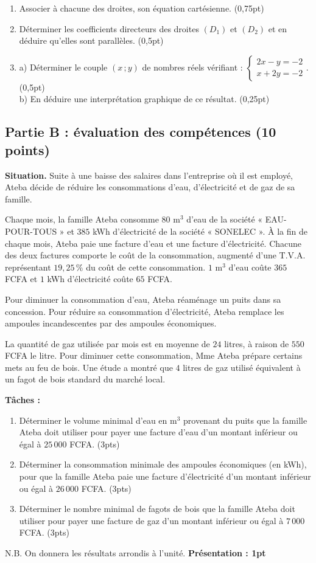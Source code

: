 \begin{enumerate}[label=\arabic*)]
\item Associer à chacune des droites, son équation cartésienne. \hfill (0,75pt)
\item Déterminer les coefficients directeurs des droites $(D_1)$ et $(D_2)$ et en déduire
qu'elles sont parallèles. \hfill (0,5pt)
\item[3)] a) Déterminer le couple $(x\,;y)$ de nombres réels vérifiant :
$\begin{cases}2x-y=-2\\x+2y=-2\end{cases}$. \hfill (0,5pt) \\
b) En déduire une interprétation graphique de ce résultat. \hfill (0,25pt)
\end{enumerate}

\subsection*{Partie B : évaluation des compétences (10 points)}

\textbf{Situation.} Suite à une baisse des salaires dans l'entreprise où il est employé,
Ateba décide de réduire les consommations d'eau, d'électricité et de gaz de sa famille.

Chaque mois, la famille Ateba consomme $80$ m$^{3}$ d'eau de la société « EAU-POUR-TOUS »
et $385$ kWh d'électricité de la société « SONELEC ». À la fin de chaque mois, Ateba paie
une facture d'eau et une facture d'électricité. Chacune des deux factures comporte le coût
de la consommation, augmenté d'une T.V.A. représentant $19{,}25\,\%$ du coût de cette
consommation. $1$ m$^{3}$ d'eau coûte $365$ FCFA et $1$ kWh d'électricité coûte $65$ FCFA.

Pour diminuer la consommation d'eau, Ateba réaménage un puits dans sa concession. Pour
réduire sa consommation d'électricité, Ateba remplace les ampoules incandescentes par des
ampoules économiques.

La quantité de gaz utilisée par mois est en moyenne de $24$ litres, à raison de $550$ FCFA
le litre. Pour diminuer cette consommation, Mme Ateba prépare certains mets au feu de bois.
Une étude a montré que $4$ litres de gaz utilisé équivalent à un fagot de bois standard du
marché local.

\textbf{Tâches :}
\begin{enumerate}[label=\arabic*)]
\item Déterminer le volume minimal d'eau en m$^{3}$ provenant du puits que la famille Ateba
doit utiliser pour payer une facture d'eau d'un montant inférieur ou égal à $25\,000$ FCFA.
\hfill (3pts)
\item Déterminer la consommation minimale des ampoules économiques (en kWh), pour que la
famille Ateba paie une facture d'électricité d'un montant inférieur ou égal à $26\,000$
FCFA. \hfill (3pts)
\item Déterminer le nombre minimal de fagots de bois que la famille Ateba doit utiliser
pour payer une facture de gaz d'un montant inférieur ou égal à $7\,000$ FCFA. \hfill (3pts)
\end{enumerate}
\noindent N.B. On donnera les résultats arrondis à l'unité. \hfill \textbf{Présentation : 1pt}


